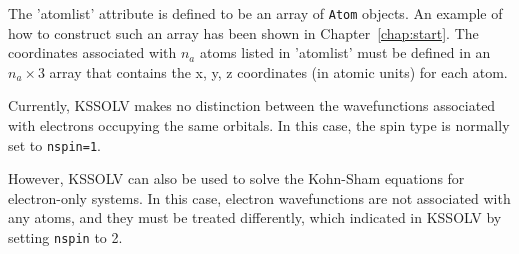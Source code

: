 \documentclass[11pt]{book}
\begin{document}
The 'atomlist' attribute is defined to be an array of {\tt Atom} objects.
An example of how to construct such an array has been shown in 
Chapter~\ref{chap:start}.
The coordinates associated with $n_a$ atoms listed in 'atomlist' must be
defined in an $n_a \times 3$ array that contains the x, y, z coordinates 
(in atomic units) for each atom. 

Currently, KSSOLV makes no distinction between the wavefunctions associated 
with electrons occupying the same orbitals. In this case, the spin type 
is normally set to {\tt nspin=1}.

However,  KSSOLV can also be used to solve the Kohn-Sham equations for 
electron-only systems. In this case, electron wavefunctions are not 
associated with any atoms, and they must be treated differently, which 
indicated in KSSOLV by setting {\tt nspin} to 2.
\end{document}

